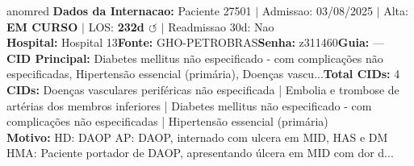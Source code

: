 \documentclass[a4paper,10pt]{article}
\begin{document}
\newpage

\begin{anomalycard}[Internacao 142202 | GHO-PETROBRAS | CRITICO (z=5.11)]{anomred}
\textbf{Dados da Internacao:} Paciente 27501 $\mid$ Admissao: 03/08/2025 $\mid$ Alta: \textcolor{anomorange}{\textbf{EM CURSO}} $\mid$ LOS: \textbf{232d \textcolor{anomorange}{$\circlearrowleft$}} $\mid$ Readmissao 30d: Nao\\
\textbf{Hospital:} Hospital 13\quad\textbf{Fonte:} GHO-PETROBRAS\quad\textbf{Senha:} z311460\quad\textbf{Guia:} ---\\
\textbf{CID Principal:} {\small Diabetes mellitus não especificado - com complicações não especificadas, Hipertensão essencial (primária), Doenças vascu...}\quad\textbf{Total CIDs:} 4\\

\textbf{CIDs:} {\scriptsize Doenças vasculares periféricas não especificada | Embolia e trombose de artérias dos membros inferiores | Diabetes mellitus não especificado - com complicações não especificadas | Hipertensão essencial (primária)}\\

\textbf{Motivo:} {\scriptsize HD: DAOP AP: DAOP, internado com ulcera em MID, HAS e DM   HMA: Paciente portador de DAOP, apresentando úlcera em MID com dor d...}\\


\end{anomalycard}
\end{document}
